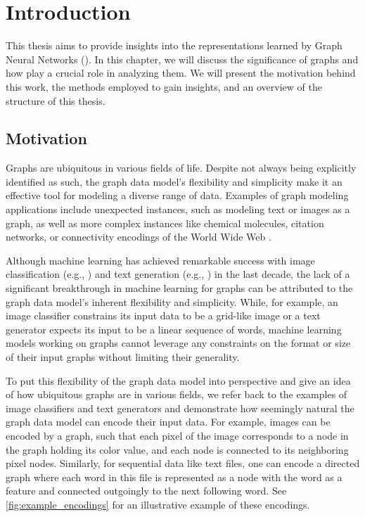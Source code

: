 \cleardoubleoddstandardpage
\chapter{Introduction}
This thesis aims to provide insights into the representations learned by \textsf{Graph Neural Networks} (\gnns). In this chapter, we will discuss the significance of graphs and how \gnns play a crucial role in analyzing them. We will present the motivation behind this work, the methods employed to gain insights, and an overview of the structure of this thesis.

\section{Motivation}
Graphs are ubiquitous in various fields of life. Despite not always being explicitly identified as such, the graph data model's flexibility and simplicity make it an effective tool for modeling a diverse range of data. Examples of graph modeling applications include unexpected instances, such as modeling text or images as a graph, as well as more complex instances like chemical molecules, citation networks, or connectivity encodings of the World Wide Web \cite{Mor+2020, Sca+2009}.

Although machine learning has achieved remarkable success with image classification (e.g., \cite{Zoph2018, He2016}) and text generation (e.g., \cite{Radford2019, Brown2020}) in the last decade, the lack of a significant breakthrough in machine learning for graphs can be attributed to the graph data model's inherent flexibility and simplicity. While, for example, an image classifier constrains its input data to be a grid-like image or a text generator expects its input to be a linear sequence of words, machine learning models working on graphs cannot leverage any constraints on the format or size of their input graphs without limiting their generality. 

To put this flexibility of the graph data model into perspective and give an idea of how ubiquitous graphs are in various fields, we refer back to the examples of image classifiers and text generators and demonstrate how seemingly natural the graph data model can encode their input data. For example, images can be encoded by a graph, such that each pixel of the image corresponds to a node in the graph holding its color value, and each node is connected to its neighboring pixel nodes. Similarly, for sequential data like text files, one can encode a directed graph where each word in this file is represented as a node with the word as a feature and connected outgoingly to the next following word. See \cref{fig:example_encodings} for an illustrative example of these encodings.

